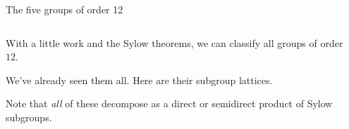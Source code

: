 \documentclass[8pt]{beamer}
\begin{document}

\begin{frame}{The five groups of order 12} %

  \vspace{5mm}

  \begin{columns}
    \begin{column}{.5\textwidth}
      With a little work and the Sylow theorems, we can classify all
      groups of order $12$. \bigskip

      We've already seen them all. Here are their subgroup lattices. \bigskip

      Note that \emph{all} of these decompose as a direct or
      semidirect product of Sylow subgroups.
    \end{column}
    \begin{column}{.45\textwidth}
    \end{column}
  \end{columns}
  
  \vspace{-40mm}


\end{frame}
\end{document}
